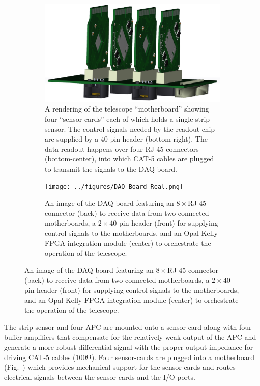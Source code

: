 \documentclass{PoS}
\begin{document}
\begin{figure}[h]
  \centering
  \begin{subfigure}[t]{0.45\textwidth}
    \includegraphics[width=\textwidth]{../figures/Half-Telescope-Full.png}
    \caption{A rendering of the telescope ``motherboard'' showing four
      ``sensor-cards'' each of which holds a single strip sensor. The control
      signals needed by the readout chip are supplied by a 40-pin header
      (bottom-right). The data readout happens over four RJ-45 connectors (bottom-center), into
      which CAT-5 cables are plugged to transmit the signals to the DAQ board.}
\label{fig:hardware:motherboard}
  \end{subfigure}
  \hspace{.3in}
  \begin{subfigure}[t]{0.45\textwidth}
    \texttt{[image: ../figures/DAQ\_Board\_Real.png]}
    \caption{An image of the DAQ board featuring an $8\times$RJ-45
      connector (back) to receive data from two connected motherboards, a
      $2\times40$-pin header (front) for supplying control signals to the
      motherboards, and an Opal-Kelly FPGA integration module (center) to
      orchestrate the operation of the telescope.}
\label{fig:hardware:daq}
  \end{subfigure}
\label{fig:hardware}
\end{figure}

The strip sensor and four APC are mounted onto a sensor-card along
with four buffer amplifiers that compensate for the relatively weak output of
the APC and generate a more robust differential signal with the proper output
impedance for driving CAT-5 cables ($100\si{\ohm}$). Four sensor-cards are
plugged into a motherboard (Fig.~) which provides mechanical support for the
sensor-cards and routes electrical signals between the sensor cards and the I/O
ports.
\end{document}
